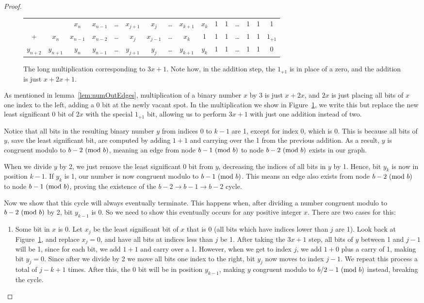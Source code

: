 \begin{proof}
\begin{figure}
\begin{tabular}{*{16}c}
  & & $ x_{n}$  & $ x_{n-1}$  & \ldots & $ x_{j+1}$  & $ x_{j}$  & \ldots & $ x_{k+1}$  & $ x_{k}$  & 1 & 1 & \ldots & 1 & 1 & 1 \\
  + & $ x_{n}$  & $ x_{n-1}$  & $ x_{n-2}$  & \ldots & $ x_{j}$  & $ x_{j-1}$  & \ldots & $ x_{k}$  & 1 & 1 & 1 & \ldots & 1 & 1 & $1_{+1}$  \\
  \hline
  $ y_{n+2}$  & $ y_{n+1}$  & $ y_{n}$  & $ y_{n-1}$  & \ldots & $ y_{j+1}$  & $ y_{j}$  & \ldots & $ y_{k+1}$  & $ y_{k}$  & 1 & 1 & \ldots & 1 & 1 & 0 
\end{tabular}
\caption{The long multiplication corresponding to $3x + 1$. Note how, in the addition step, the $1_{+1}$ is in place of a zero, and the addition is just $x + 2x + 1$.}
\label{fig:mul}
\end{figure}
As mentioned in lemma~\ref{lem:numOutEdges}, multiplication of a binary number $x$ by 3 is just $x + 2x$, and $2x$ is just placing all bits of $x$ one index to the left, adding a 0 bit at the newly vacant spot. In the multiplication we show in Figure~\ref{fig:mul}, we write this but replace the new least significant 0 bit of $2x$ with the special $1_{+1}$ bit, allowing us to perform $3x+1$ with just one addition instead of two. \par
Notice that all bits in the resulting binary number $y$ from indices 0 to $k-1$ are 1, except for index 0, which is 0. This is because all bits of $y$, save the least significant bit, are computed by adding $1+1$ and carrying over the 1 from the previous addition. As a result, $y$ is congruent modulo to $b-2 \ (\mathrm{mod}\ b)$, meaning an edge from node $b-1 \ (\mathrm{mod}\ b)$ to node $b-2 \ (\mathrm{mod}\ b)$ exists in our graph.\par
When we divide $y$ by 2, we just remove the least significant 0 bit from $y$, decreasing the indices of all bits in $y$ by 1. Hence, bit $y_k$ is now in position $k-1$. If $y_k$ is 1, our number is now congruent modulo to $b-1 \ (\mathrm{mod}\ b)$. This means an edge also exists from node $b-2 \ (\mathrm{mod}\ b)$ to node $b-1 \ (\mathrm{mod}\ b)$, proving the existence of the $b-2 \rightarrow b-1 \rightarrow b-2$ cycle. \par
Now we show that this cycle will always eventually terminate. This happens when, after dividing a number congruent modulo to $b-2 \ (\mathrm{mod}\ b)$ by 2, bit $y_{k-1}$ is 0. So we need to show this eventually occurs for any positive integer $x$. There are two cases for this:
\begin{enumerate}
    \item Some bit in $x$ is 0. Let $x_j$ be the least significant bit of $x$ that is 0 (all bits which have indices lower than $j$ are 1). Look back at Figure~\ref{fig:mul}, and replace $x_j = 0$, and have all bits at indices less than $j$ be 1. After taking the $3x+1$ step, all bits of $y$ between 1 and $j-1$ will be 1, since for each bit, we add $1 + 1$ and carry over a 1. However, when we get to index $j$, we add $1 + 0$ plus a carry of 1, making bit $y_j = 0$. Since after we divide by 2 we move all bits one index to the right, bit $y_j$ now moves to index $j-1$. We repeat this process a total of $j-k+1$ times. After this, the 0 bit will be in position $y_{k-1}$, making $y$ congruent modulo to $b/2 - 1 \ (\mathrm{mod}\ b)$ instead, breaking the cycle.

\end{enumerate}
\end{proof}
